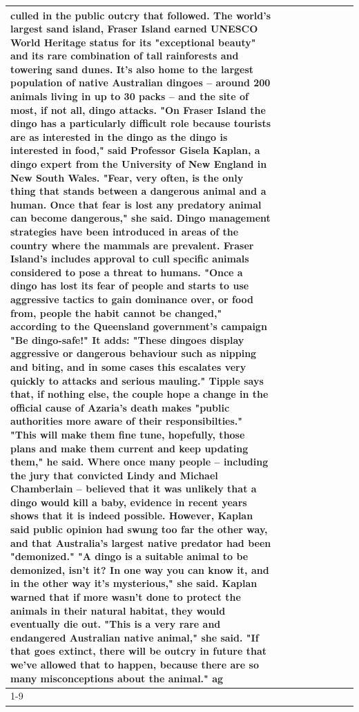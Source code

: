 \begin{table}[H]
\begin{tabular}{lllrlllll}
culled in the public outcry that followed. The world's largest sand island, Fraser Island earned UNESCO World Heritage status for its "exceptional beauty" and its rare combination of tall rainforests and towering sand dunes. It's also home to the largest population of native Australian dingoes -- around 200 animals living in up to 30 packs -- and the site of most, if not all, dingo attacks. "On Fraser Island the dingo has a particularly difficult role because tourists are as interested in the dingo as the dingo is interested in food," said Professor Gisela Kaplan, a dingo expert from the University of New England in New South Wales. "Fear, very often, is the only thing that stands between a dangerous animal and a human. Once that fear is lost any predatory animal can become dangerous," she said. Dingo management strategies have been introduced in areas of the country where the mammals are prevalent. Fraser Island's includes approval to cull specific animals considered to pose a threat to humans. "Once a dingo has lost its fear of people and starts to use aggressive tactics to gain dominance over, or food from, people the habit cannot be changed," according to the Queensland government's campaign "Be dingo-safe!" It adds: "These dingoes display aggressive or dangerous behaviour such as nipping and biting, and in some cases this escalates very quickly to attacks and serious mauling." Tipple says that, if nothing else, the couple hope a change in the official cause of Azaria's death makes "public authorities more aware of their responsibilties." "This will make them fine tune, hopefully, those plans and make them current and keep updating them," he said. Where once many people -- including the jury that convicted Lindy and Michael Chamberlain -- believed that it was unlikely that a dingo would kill a baby, evidence in recent years shows that it is indeed possible. However, Kaplan said public opinion had swung too far the other way, and that Australia's largest native predator had been "demonized." "A dingo is a suitable animal to be demonized, isn't it? In one way you can know it, and in the other way it's mysterious," she said. Kaplan warned that if more wasn't done to protect the animals in their natural habitat, they would eventually die out. "This is a very rare and endangered Australian native animal," she said. "If that goes extinct, there will be outcry in future that we've allowed that to happen, because there are so many misconceptions about the animal." ag \\
\cline{1-9}

\end{tabular}
\end{table}
